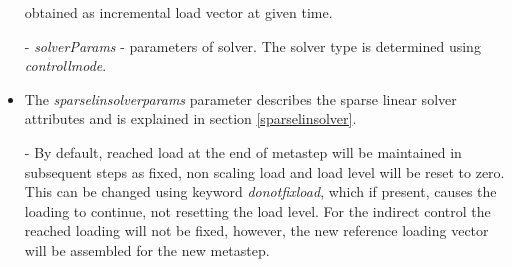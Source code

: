 \documentclass[a4paper]{article}
\newcommand{\param}[1]{{\em #1}}
\begin{document}
\begin{itemize}
obtained as incremental load vector at given time.
\item[-] \param{solverParams} - parameters of solver. The solver type
is determined using \param{controllmode}.
\item The  \param{sparselinsolverparams} parameter describes the sparse
linear solver attributes and is explained in section
\ref{sparselinsolver}.
\item[-] By default, reached load at the end of
metastep will be maintained in subsequent steps as fixed, non scaling
load and load level will be reset to zero. This can be changed using keyword \param{donotfixload}, which if
present, causes the loading to continue, not resetting the load
level. For the indirect control the reached loading will not be
fixed, however, the new reference loading vector will be assembled for
the new metastep.
\end{itemize}
\end{document}

